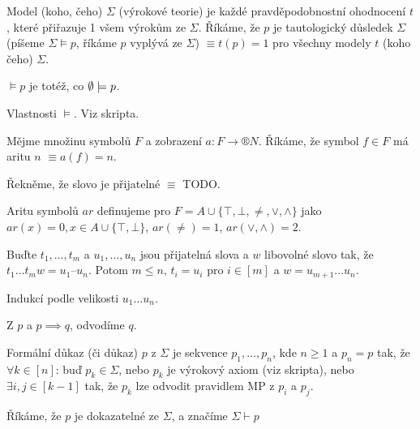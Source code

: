 \documentclass[12pt]{article}                   %
\begin{document}
    \begin{definice}[Model]
        Model (koho, čeho) $\Sigma$ (výrokové teorie) je každé pravděpodobnostní ohodnocení $t$, které přiřazuje 1 všem výrokům ze $\Sigma$. Říkáme, že $p$ je tautologický důsledek $\Sigma$ (píšeme $\Sigma \models p$, říkáme $p$ vyplývá ze $\Sigma$) $≡ t(p) = 1$ pro všechny modely $t$ (koho čeho) $\Sigma$.
    \end{definice}

    \begin{poznamka}
        $\models p$ je totéž, co $\emptyset \models p$.
    \end{poznamka}

    \begin{lemma}
        Vlastnosti $\models$. Viz skripta.
    \end{lemma}

    \begin{definice}[Arita]
        Mějme množinu symbolů $F$ a zobrazení $a: F \rightarrow ®N$. Říkáme, že symbol $f \in F$ má aritu $n$ $≡ a(f) = n$.

        Řekněme, že slovo je přijatelné $≡$ TODO.
    \end{definice}

    \begin{definice}
        Aritu symbolů $ar$ definujeme pro $F = A \cup \{\top, \bot, \neq, \lor, \land\}$ jako $ar(x) = 0, x\in A \cup \{\top, \bot\}$, $ar(\neq) = 1$, $ar(\lor, \land) = 2$.
    \end{definice}

    \begin{lemma}
        Buďte $t_1, …, t_m$ a $u_1, …, u_n$ jsou přijatelná slova a $w$ libovolné slovo tak, že $t_1…t_mw=u_1–u_n$. Potom $m ≤ n$, $t_i = u_i$ pro $i \in [m]$ a $w = u_{m+1}…u_n$.

        \begin{dukazin}
            Indukcí podle velikosti $u_1…u_n$.
        \end{dukazin}
    \end{lemma}


    \begin{definice}[Modus Ponens (= MP = odvozovací pravidla)]
        Z $p$ a $p \implies q$, odvodíme $q$.
    \end{definice}

    \begin{definice}[Důkaz]
        Formální důkaz (či důkaz) $p$ z $\Sigma$ je sekvence $p_1, …, p_n$, kde $n≥1$ a $p_n = p$ tak, že $\forall k \in [n]$: buď $p_k \in \Sigma$, nebo $p_k$ je výrokový axiom (viz skripta), nebo $\exists i, j \in [k-1]$ tak, že $p_k$ lze odvodit pravidlem MP z $p_i$ a $p_j$.

        Říkáme, že $p$ je dokazatelné ze $\Sigma$, a značíme $\Sigma \vdash p$
    \end{definice}
\end{document}
